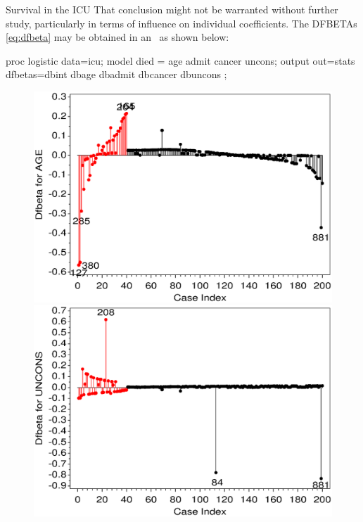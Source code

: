 \begin{Example}[icu2]{Survival in the ICU}
That conclusion might not be warranted without further study, particularly
in terms of influence on individual coefficients.
The DFBETAs \eqref{eq:dfbeta} may be obtained in an \ODS\ as shown below:
\begin{listing}
proc logistic data=icu;
   model died = age admit cancer uncons;
   output out=stats dfbetas=dbint dbage dbadmit dbcancer dbuncons ;
\end{listing}

\begin{figure}[htb]
 \begin{minipage}[t]{.49\linewidth}
  \includegraphics[width=1\linewidth,clip]{ch6/fig/icu4b1}
 \end{minipage}%
 \hfill
 \begin{minipage}[t]{.49\linewidth}
  \includegraphics[width=1\linewidth,clip]{ch6/fig/icu4b2}

\end{minipage}
\end{figure}
\end{Example}
